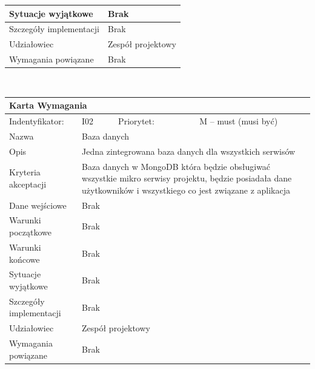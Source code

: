 \documentclass[a4paper,11pt]{report}
\begin{document}
\begin{itemize}
\begin{tabular}{|p{3cm}|p{2cm}|p{2cm}|p{6cm}|}
		Sytuacje wyjątkowe & \multicolumn{3}{|p{10 cm}|}{Brak}\\
		\hline
		Szczegóły implementacji & \multicolumn{3}{|p{10 cm}|}{Brak}\\
		\hline
		Udziałowiec & \multicolumn{3}{|p{10 cm}|}{Zespół projektowy}\\
		\hline
		Wymagania powiązane & \multicolumn{3}{|p{10 cm}|}{Brak}\\
		\hline
		\end{tabular}\\
		\begin{tabular}{|p{3cm}|p{2cm}|p{2cm}|p{6cm}|}
		\hline
		\multicolumn{4}{|p{12 cm}|}{Karta Wymagania}\\
		\hline
		Indentyfikator: & I02 & Priorytet: & M – must (musi być)\\
		\hline
		Nazwa & \multicolumn{3}{|p{10 cm}|}{Baza danych}\\
		\hline
		Opis & \multicolumn{3}{|p{10 cm}|}{Jedna zintegrowana baza danych dla wszystkich serwisów}\\
		\hline
		Kryteria akceptacji & \multicolumn{3}{|p{10 cm}|}{Baza danych w MongoDB która będzie obsługiwać wszystkie mikro serwisy projektu, będzie posiadała dane użytkowników i wszystkiego co jest związane z aplikacja}\\
		\hline
		Dane wejściowe & \multicolumn{3}{|p{10 cm}|}{Brak}\\
		\hline
		Warunki początkowe & \multicolumn{3}{|p{10 cm}|}{Brak}\\
		\hline
		Warunki końcowe & \multicolumn{3}{|p{10 cm}|}{Brak}\\
		\hline
		Sytuacje wyjątkowe & \multicolumn{3}{|p{10 cm}|}{Brak}\\
		\hline
		Szczegóły implementacji & \multicolumn{3}{|p{10 cm}|}{Brak}\\
		\hline
		Udziałowiec & \multicolumn{3}{|p{10 cm}|}{Zespół projektowy}\\
		\hline
		Wymagania powiązane & \multicolumn{3}{|p{10 cm}|}{Brak}\\
		\hline
		\end{tabular}\\
	\end{itemize}
\end{document}
